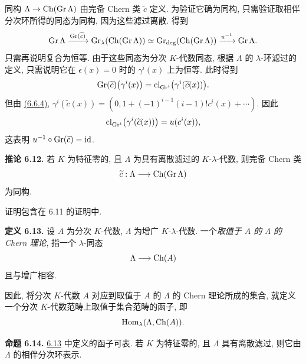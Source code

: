 同构 \(\Lambda\to\operatorname{Ch}(\operatorname{Gr}\Lambda)\) 由完备 Chern 类 \(\widetilde c\) 定义. 为验证它确为同构, 只需验证取相伴分次环所得的同态为同构, 因为这些滤过离散. 得到
\[
  \operatorname{Gr}\Lambda
   \xrightarrow{\operatorname{Gr}(\widetilde c)}
  \operatorname{Gr}_{\lambda}(\operatorname{Ch}(\operatorname{Gr}\Lambda))
   \simeq
  \operatorname{Gr}_{\deg}(\operatorname{Ch}(\operatorname{Gr}\Lambda))
   \xrightarrow{u^{-1}}
  \operatorname{Gr}\Lambda .
\]
只需再说明复合为恒等. 由于这些同态为分次 \(K\)-代数同态, 根据 \(\Lambda\) 的 \(\lambda\)-环滤过的定义, 只需说明它在 \(\epsilon(x)=0\) 时的 \(\gamma^i(x)\) 上为恒等. 此时得到
\[
  \operatorname{Gr}(\widetilde c)\bigl(\gamma^i(x)\bigr)
  =
  \operatorname{cl}_{\operatorname{Gr}^i}\bigl(\gamma^i(\widetilde c(x))\bigr).
\]
但由 \hyperlink{sga6.e05.cor.6-6-4}{(6.6.4)}, \(\gamma^i(\widetilde c(x))=(0,1+(-1)^{i-1}(i-1)!c^i(x)+\cdots)\). 因此
\[
  \operatorname{cl}_{\operatorname{Gr}^i}\bigl(\gamma^i(\widetilde c(x))\bigr)=u(c^i(x)),
\]
这表明 \(u^{-1}\circ\operatorname{Gr}(\widetilde c)=\operatorname{id}\).

\textbf{推论 6.12.} 若 \(K\) 为特征零的, 且 \(\Lambda\) 为具有离散滤过的 \(K\)-\(\lambda\)-代数, 则完备 Chern 类
\[
  \widetilde c:\Lambda\longrightarrow \operatorname{Ch}(\operatorname{Gr}\Lambda)
\]
为同构.

证明包含在 6.11 的证明中.

\textbf{定义 6.13.} 设 \(A\) 为分次 \(K\)-代数, \(\Lambda\) 为增广 \(K\)-\(\lambda\)-代数. 一个\emph{取值于 \(A\) 的 \(\Lambda\) 的 Chern 理论}, 指一个 \(\lambda\)-同态
\[
  \Lambda\longrightarrow \operatorname{Ch}(A)
\]
且与增广相容.

因此, 将分次 \(K\)-代数 \(A\) 对应到取值于 \(A\) 的 \(\Lambda\) 的 Chern 理论所成的集合, 就定义一个分次 \(K\)-代数范畴上取值于集合范畴的函子, 即
\[
  \operatorname{Hom}_\lambda(\Lambda,\operatorname{Ch}(A)).
\]

\textbf{命题 6.14.} \hyperlink{sga6.e05.def.6-13}{6.13} 中定义的函子可表. 若 \(K\) 为特征零的, 且 \(\Lambda\) 具有离散滤过, 则它由 \(\Lambda\) 的相伴分次环表示.

